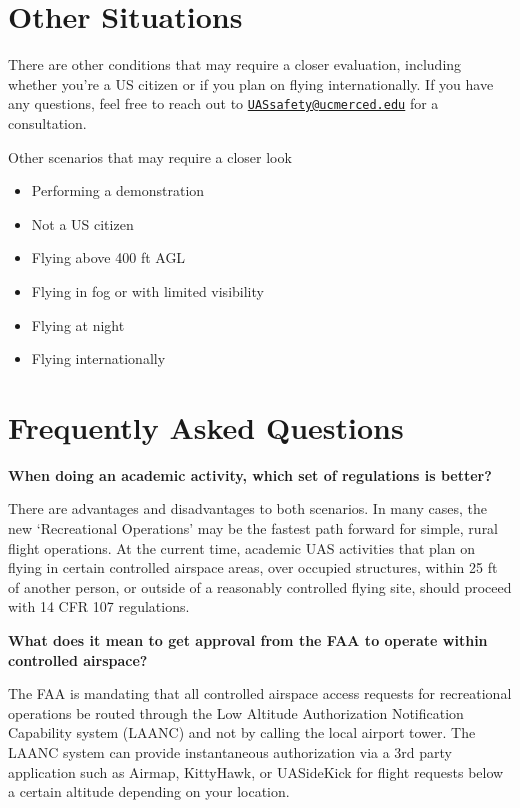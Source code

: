 \documentclass[
]{book}
\providecommand{\tightlist}{%
  \setlength{\itemsep}{0pt}\setlength{\parskip}{0pt}}
\begin{document}
\hypertarget{other-situations}{%
\section{Other Situations}\label{other-situations}}

There are other conditions that may require a closer evaluation, including whether you're a US citizen or if you plan on flying internationally. If you have any questions, feel free to reach out to \href{mailto:UASsafety@ucmerced.edu}{\nolinkurl{UASsafety@ucmerced.edu}} for a consultation.

Other scenarios that may require a closer look

\begin{itemize}
\tightlist
\item
  Performing a demonstration
\item
  Not a US citizen
\item
  Flying above 400 ft AGL
\item
  Flying in fog or with limited visibility
\item
  Flying at night
\item
  Flying internationally
\end{itemize}

\hypertarget{frequently-asked-questions}{%
\section{Frequently Asked Questions}\label{frequently-asked-questions}}

\textbf{When doing an academic activity, which set of regulations is better?}

There are advantages and disadvantages to both scenarios. In many cases, the new `Recreational Operations' may be the fastest path forward for simple, rural flight operations. At the current time, academic UAS activities that plan on flying in certain controlled airspace areas, over occupied structures, within 25 ft of another person, or outside of a reasonably controlled flying site, should proceed with 14 CFR 107 regulations.

\textbf{What does it mean to get approval from the FAA to operate within controlled airspace?}

The FAA is mandating that all controlled airspace access requests for recreational operations be routed through the Low Altitude Authorization Notification Capability system (LAANC) and not by calling the local airport tower. The LAANC system can provide instantaneous authorization via a 3rd party application such as Airmap, KittyHawk, or UASideKick for flight requests below a certain altitude depending on your location.
\end{document}
